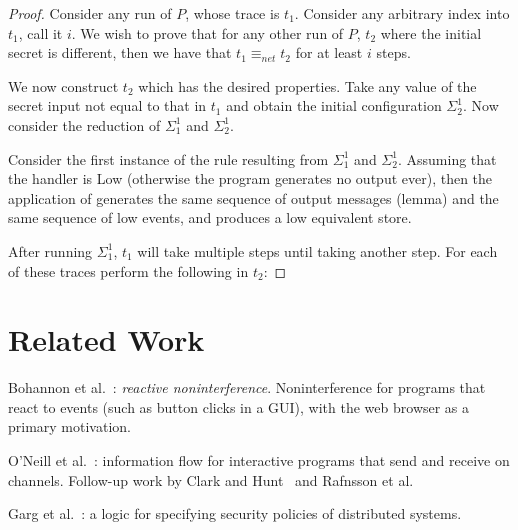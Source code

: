 \documentclass[conference]{IEEEtran}
\newcommand{\code}[1]{\text{\lstinline!#1!}}
\theoremstyle{definition}
\newcommand{\tr}{t}
\begin{document}
\begin{proof}
  Consider any run of $P$, whose trace is $\tr_1$.  Consider any
  arbitrary index into $\tr_1$, call it $i$.  We wish to prove that
  for any other run of $P$, $\tr_2$ where the initial secret is
  different, then we have that $\tr_1 \equiv_{net} \tr_2$ for at least
  $i$ steps.
  
  We now construct $\tr_2$ which has the desired properties.  Take any
  value of the secret input not equal to that in $\tr_1$ and obtain
  the initial configuration $\Sigma_2^1$.  Now consider the reduction
  of $\Sigma_1^1$ and $\Sigma_2^1$.
  
  Consider the first instance of the \code{THandle} rule resulting
  from $\Sigma_1^1$ and $\Sigma_2^1$.  Assuming that the handler is
  Low (otherwise the program generates no output ever), then the
  application of \code{THandle} generates the same sequence of output
  messages (lemma) and the same sequence of low events, and produces a
  low equivalent store.
  
  After running $\Sigma_1^1$, $\tr_1$ will take multiple steps until
  taking another \code{THandle} step.  For each of these traces
  perform the following in $\tr_2$:
\end{proof}

\section{Related Work}
\label{sec:related-work}


Bohannon et al.~\cite{Bohannon:09}: \emph{reactive noninterference}.
Noninterference for programs that react to events (such as button clicks in a GUI), 
with the web browser as a primary motivation. 

O'Neill et al.~\cite{O'Neill:06}: information flow for interactive programs that
send and receive on channels. 
Follow-up work by Clark and Hunt~\cite{Clark:09} and Rafnsson et al.~\cite{Rafnsson:12}

Garg et al.~\cite{Garg:06}: a logic for specifying security policies of distributed systems.
\end{document}
